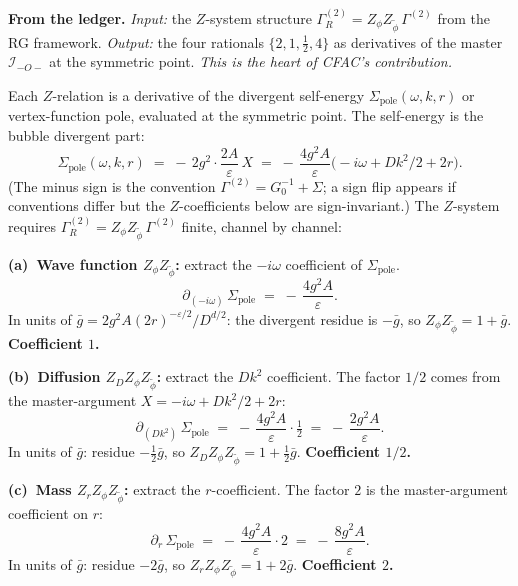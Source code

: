 \documentclass[11pt,a4paper]{article}
\begin{document}
\begin{cfacbox}
\textbf{From the ledger.} \emph{Input:} the $Z$-system structure
$\Gamma^{(2)}_{R} = Z_{\phi}Z_{\widetilde\phi}\,\Gamma^{(2)}$ from the RG framework.
\emph{Output:} the four rationals $\{2,1,\tfrac{1}{2},4\}$ as derivatives of the master
$\mathcal I_{-O-}$ at the symmetric point. \emph{This is the heart of CFAC's contribution.}

\medskip
Each $Z$-relation is a derivative of the divergent self-energy
$\Sigma_{\text{pole}}(\omega,k,r)$ or vertex-function pole, evaluated at the symmetric
point. The self-energy is the bubble divergent part:
\[
\Sigma_{\text{pole}}(\omega,k,r) \;=\; -\,2g^{2}\!\cdot\! \frac{2A}{\varepsilon}\,X
\;=\; -\,\frac{4g^{2}A}{\varepsilon}\bigl(-i\omega + Dk^{2}/2 + 2r\bigr).
\]
(The minus sign is the convention $\Gamma^{(2)} = G_{0}^{-1} + \Sigma$; a sign flip
appears if conventions differ but the $Z$-coefficients below are sign-invariant.)
The $Z$-system requires $\Gamma^{(2)}_{R} = Z_{\phi}Z_{\widetilde\phi}\,\Gamma^{(2)}$
finite, channel by channel:

\smallskip
\noindent\textbf{(a)\ Wave function $Z_{\phi}Z_{\widetilde\phi}$:} extract the
$-i\omega$ coefficient of $\Sigma_{\text{pole}}$.
\[
\partial_{(-i\omega)}\,\Sigma_{\text{pole}} \;=\; -\,\frac{4g^{2}A}{\varepsilon}.
\]
In units of $\bar g = 2g^{2}A(2r)^{-\varepsilon/2}/D^{d/2}$: the divergent residue is
$-\bar g$, so $Z_{\phi}Z_{\widetilde\phi} = 1 + \bar g$. \textbf{Coefficient $\boxed{1}$.}

\smallskip
\noindent\textbf{(b)\ Diffusion $Z_{D}Z_{\phi}Z_{\widetilde\phi}$:} extract the
$Dk^{2}$ coefficient. The factor $1/2$ comes from the master-argument
$X = -i\omega + Dk^{2}/2 + 2r$:
\[
\partial_{(Dk^{2})}\,\Sigma_{\text{pole}} \;=\; -\,\frac{4g^{2}A}{\varepsilon}\cdot\tfrac{1}{2}
\;=\; -\,\frac{2g^{2}A}{\varepsilon}.
\]
In units of $\bar g$: residue $-\tfrac{1}{2}\bar g$, so $Z_{D}Z_{\phi}Z_{\widetilde\phi}
= 1 + \tfrac{1}{2}\bar g$. \textbf{Coefficient $\boxed{1/2}$.}

\smallskip
\noindent\textbf{(c)\ Mass $Z_{r}Z_{\phi}Z_{\widetilde\phi}$:} extract the $r$-coefficient.
The factor $2$ is the master-argument coefficient on $r$:
\[
\partial_{r}\,\Sigma_{\text{pole}} \;=\; -\,\frac{4g^{2}A}{\varepsilon}\cdot 2
\;=\; -\,\frac{8g^{2}A}{\varepsilon}.
\]
In units of $\bar g$: residue $-2\bar g$, so $Z_{r}Z_{\phi}Z_{\widetilde\phi} = 1 + 2\bar g$.
\textbf{Coefficient $\boxed{2}$.}


\end{cfacbox}
\end{document}
